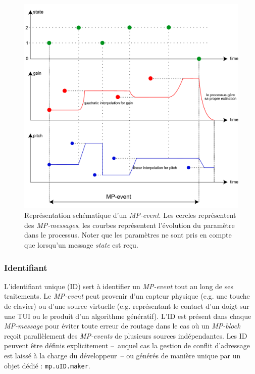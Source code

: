 \begin{figure}[!htbp]
	\captionsetup{format=plain}
	\includegraphics[width=\textwidth]{gfx/04_algorithms/MP-event-model.pdf}
	\caption[Représentation schématique d'un \textit{MP-event}]{Représentation schématique d'un \textit{MP-event}. Les cercles représentent des \textit{MP-messages}, les courbes représentent l'évolution du paramètre dans le processus. Noter que les paramètres ne sont pris en compte que lorsqu'un message \textit{state} est reçu.}
	\label{fig:algorithms:MP-event-model}
\end{figure}


\subsubsection{Identifiant}

\noindent L'identifiant unique (ID) sert à identifier un \textit{MP-event} tout au long de ses traitements. Le \textit{MP-event} peut provenir d'un capteur physique (e.g. une touche de clavier) ou d'une source virtuelle (e.g. représentant le contact d'un doigt sur une \gls{TUI} ou le produit d'un algorithme génératif). L'ID est présent dans chaque \textit{MP-message} pour éviter toute erreur de routage dans le cas où un \textit{MP-block} reçoit parallèlement des \textit{MP-events} de plusieurs sources indépendantes. Les ID peuvent être définis explicitement --~auquel cas la gestion de conflit d'adressage est laissé à la charge du développeur~-- ou générés de manière unique par un objet dédié : \verb|mp.uID.maker|.

